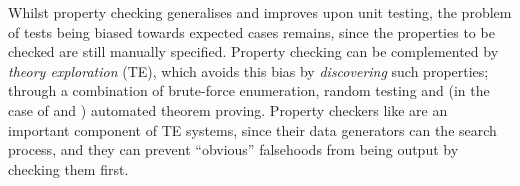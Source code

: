 Whilst property checking generalises and improves upon unit testing, the problem
of tests being biased towards expected cases remains, since the properties to be
checked are still manually specified. Property checking can be complemented by
\emph{theory exploration} (TE), which avoids this bias by \emph{discovering}
such properties; through a combination of brute-force enumeration, random
testing and (in the case of \hipspec{} and \hipster{}) automated theorem
proving. Property checkers like \quickcheck{} are an important component of TE
systems, since their data generators can the search process, and they can
prevent ``obvious'' falsehoods from being output by checking them first.
